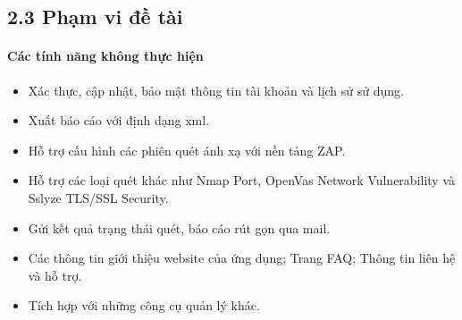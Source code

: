 \subsection*{2.3  Phạm vi đề tài}
\paragraph{Các tính năng không thực hiện}
\begin{itemize}
    \item Xác thực, cập nhật, bảo mật thông tin tài khoản và lịch sử sử dụng.
    \item Xuất báo cáo với định dạng xml.
    \item Hỗ trợ cấu hình các phiên quét ánh xạ với nền tảng ZAP.
    \item Hỗ trợ các loại quét khác như Nmap Port, OpenVas Network Vulnerability và Sslyze TLS/SSL Security.
    \item Gửi kết quả trạng thái quét, báo cáo rút gọn qua mail.
    \item Các thông tin giới thiệu website của ứng dụng; Trang FAQ; Thông tin liên hệ và hỗ trợ.
    \item Tích hợp với những công cụ quản lý khác.
\end{itemize}